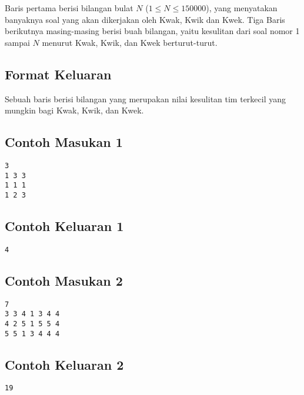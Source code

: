 \documentclass{article}
\begin{document}
Baris pertama berisi bilangan bulat $N$ ($ 1 \leq N \leq 150000 $), yang menyatakan banyaknya soal yang akan dikerjakan oleh Kwak, Kwik dan Kwek.
Tiga Baris berikutnya masing-masing berisi buah bilangan, yaitu kesulitan dari soal nomor 1 sampai $N$ menurut Kwak, Kwik, dan Kwek berturut-turut.

\subsection*{Format Keluaran}
Sebuah baris berisi bilangan yang merupakan nilai kesulitan tim terkecil yang mungkin bagi Kwak, Kwik, dan Kwek.
\\

\begin{multicols}{2}
\subsection*{Contoh Masukan 1}
\begin{lstlisting}
3
1 3 3
1 1 1
1 2 3
\end{lstlisting}
\columnbreak
\subsection*{Contoh Keluaran 1}
\begin{lstlisting}
4
\end{lstlisting}
\vfill
\null
\end{multicols}

\begin{multicols}{2}
\subsection*{Contoh Masukan 2}
\begin{lstlisting}
7
3 3 4 1 3 4 4
4 2 5 1 5 5 4
5 5 1 3 4 4 4
\end{lstlisting}
\columnbreak
\subsection*{Contoh Keluaran 2}
\begin{lstlisting}
19
\end{lstlisting}
\vfill
\null
\end{multicols}


\pagebreak
\end{document}
